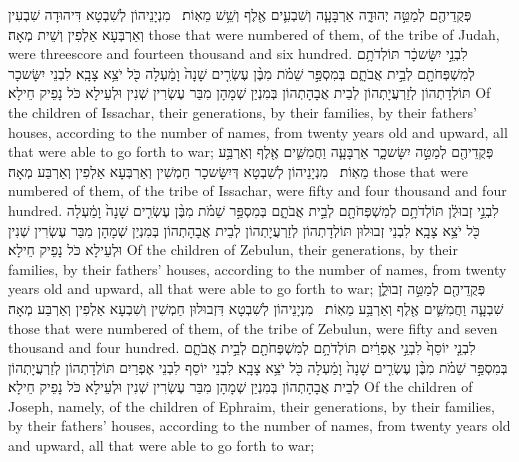 {פְּקֻדֵיהֶ֖ם לְמַטֵּ֣ה יְהוּדָ֑ה אַרְבָּעָ֧ה וְשִׁבְעִ֛ים אֶ֖לֶף וְשֵׁ֥שׁ מֵאֽוֹת׃ \petucha }
{מִנְיָנֵיהוֹן לְשִׁבְטָא דִּיהוּדָה שִׁבְעִין וְאַרְבְּעָא אַלְפִין וְשֵׁית מְאָה׃}
{those that were numbered of them, of the tribe of Judah, were threescore and fourteen thousand and six hundred.}{}
{לִבְנֵ֣י יִשָּׂשכָ֔ר תּוֹלְדֹתָ֥ם לְמִשְׁפְּחֹתָ֖ם לְבֵ֣ית אֲבֹתָ֑ם בְּמִסְפַּ֣ר שֵׁמֹ֗ת מִבֶּ֨ן עֶשְׂרִ֤ים שָׁנָה֙ וָמַ֔עְלָה כֹּ֖ל יֹצֵ֥א צָבָֽא׃}
{לִבְנֵי יִשָּׂשכָר תּוֹלְדָתְהוֹן לְזַרְעֲיָתְהוֹן לְבֵית אֲבָהָתְהוֹן בְּמִנְיַן שְׁמָהָן מִבַּר עֶשְׂרִין שְׁנִין וּלְעֵילָא כֹּל נָפֵיק חֵילָא׃}
{Of the children of Issachar, their generations, by their families, by their fathers’ houses, according to the number of names, from twenty years old and upward, all that were able to go forth to war;}{}
{פְּקֻדֵיהֶ֖ם לְמַטֵּ֣ה יִשָּׂשכָ֑ר אַרְבָּעָ֧ה וַחֲמִשִּׁ֛ים אֶ֖לֶף וְאַרְבַּ֥ע מֵאֽוֹת׃ \petucha }
{מִנְיָנֵיהוֹן לְשִׁבְטָא דְּיִשָּׂשכָר חַמְשִׁין וְאַרְבְּעָא אַלְפִין וְאַרְבַּע מְאָה׃}
{those that were numbered of them, of the tribe of Issachar, were fifty and four thousand and four hundred.}{}
{לִבְנֵ֣י זְבוּלֻ֔ן תּוֹלְדֹתָ֥ם לְמִשְׁפְּחֹתָ֖ם לְבֵ֣ית אֲבֹתָ֑ם בְּמִסְפַּ֣ר שֵׁמֹ֗ת מִבֶּ֨ן עֶשְׂרִ֤ים שָׁנָה֙ וָמַ֔עְלָה כֹּ֖ל יֹצֵ֥א צָבָֽא׃}
{לִבְנֵי זְבוּלוּן תּוֹלְדָתְהוֹן לְזַרְעֲיָתְהוֹן לְבֵית אֲבָהָתְהוֹן בְּמִנְיַן שְׁמָהָן מִבַּר עֶשְׂרִין שְׁנִין וּלְעֵילָא כֹּל נָפֵיק חֵילָא׃}
{Of the children of Zebulun, their generations, by their families, by their fathers’ houses, according to the number of names, from twenty years old and upward, all that were able to go forth to war;}{}
{פְּקֻדֵיהֶ֖ם לְמַטֵּ֣ה זְבוּלֻ֑ן שִׁבְעָ֧ה וַחֲמִשִּׁ֛ים אֶ֖לֶף וְאַרְבַּ֥ע מֵאֽוֹת׃ \petucha }
{מִנְיָנֵיהוֹן לְשִׁבְטָא דִּזְבוּלוּן חַמְשִׁין וְשִׁבְעָא אַלְפִין וְאַרְבַּע מְאָה׃}
{those that were numbered of them, of the tribe of Zebulun, were fifty and seven thousand and four hundred.}{}
{לִבְנֵ֤י יוֹסֵף֙ לִבְנֵ֣י אֶפְרַ֔יִם תּוֹלְדֹתָ֥ם לְמִשְׁפְּחֹתָ֖ם לְבֵ֣ית אֲבֹתָ֑ם בְּמִסְפַּ֣ר שֵׁמֹ֗ת מִבֶּ֨ן עֶשְׂרִ֤ים שָׁנָה֙ וָמַ֔עְלָה כֹּ֖ל יֹצֵ֥א צָבָֽא׃}
{לִבְנֵי יוֹסֵף לִבְנֵי אֶפְרַיִם תּוֹלְדָתְהוֹן לְזַרְעֲיָתְהוֹן לְבֵית אֲבָהָתְהוֹן בְּמִנְיַן שְׁמָהָן מִבַּר עֶשְׂרִין שְׁנִין וּלְעֵילָא כֹּל נָפֵיק חֵילָא׃}
{Of the children of Joseph, namely, of the children of Ephraim, their generations, by their families, by their fathers’ houses, according to the number of names, from twenty years old and upward, all that were able to go forth to war;}{}
